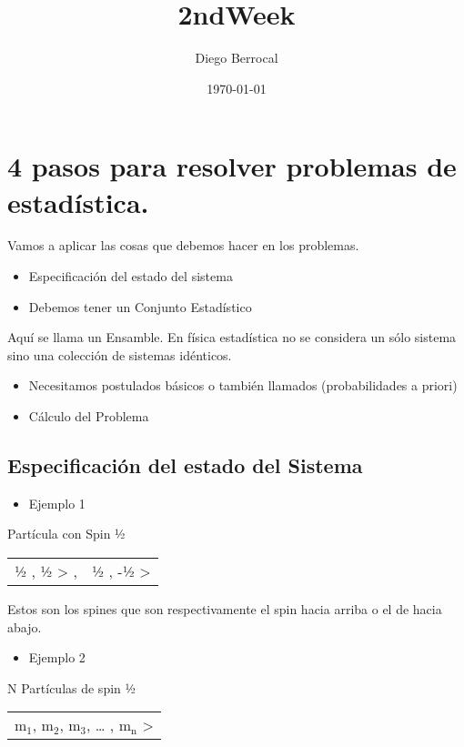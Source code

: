 \documentclass[11pt]{article}
\author{Diego Berrocal}
\date{\today}
\title{2ndWeek}
\begin{document}
\maketitle
\tableofcontents

\section{4 pasos para resolver problemas de estadística.}
\label{sec-1}
Vamos a aplicar las cosas que debemos hacer en los problemas.
\begin{itemize}
\item Especificación del estado del sistema

\item Debemos tener un Conjunto Estadístico
\end{itemize}
Aquí se llama un Ensamble. En física estadística no se considera un
sólo sistema sino una colección de sistemas idénticos.
\begin{itemize}
\item Necesitamos postulados básicos o también llamados (probabilidades a priori)
\item Cálculo del Problema
\end{itemize}

\subsection{Especificación del estado del Sistema}
\label{sec-1-1}
\begin{itemize}
\item Ejemplo 1
\end{itemize}
Partícula con Spin ½
\begin{center}
\begin{tabular}{ll}
½ , ½ > , & ½ , -½ >\\
\end{tabular}
\end{center}
Estos son los spines que son respectivamente el spin hacia arriba o el de hacia abajo.
\begin{itemize}
\item Ejemplo 2
\end{itemize}
N Partículas de spin ½


\begin{center}
\begin{tabular}{l}
m$_{\text{1}}$, m$_{\text{2}}$, m$_{\text{3}}$, \ldots{} , m$_{\text{n}}$ >\\
\end{tabular}
\end{center}
\end{document}
